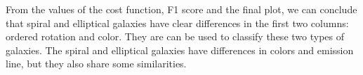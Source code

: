 From the values of the cost function, F1 score and the final plot, we can conclude that spiral and elliptical galaxies have clear differences in the first two columns: ordered rotation and color. They are can be used to classify these two types of galaxies. The spiral and elliptical galaxies have differences in colors and emission line, but they also share some similarities.
